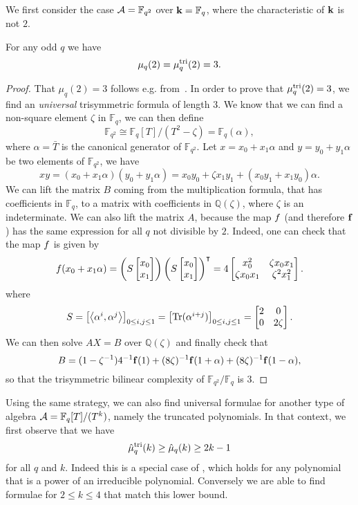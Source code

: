 \documentclass[11pt]{article}
\begin{document}
We first consider the case $\mathcal{A}=\mathbb{F}_{q^2}$ over $\mathbf{k}=\mathbb{F}_q$, where
the characteristic of $\mathbf{k}$ is not $2$.
\begin{prop}
For any odd $q$ we have
\[
  \mu_q(2) = \mu^{\textrm{tri}}_q(2) = 3.
\]
\end{prop}
\begin{proof}
That $\mu_q(2)=3$ follows e.g. from~\cite[Theorem 2.2]{BCPRRR19}. In order to prove that
$\mu^{\textrm{tri}}_q(2) = 3$, we find an \emph{universal} trisymmetric formula of length
$3$. We know that we can find a non-square element $\zeta$ in $\mathbb{F}_q$, we
can then define
\[
  \mathbb{F}_{q^2}\cong\mathbb{F}_q[T]/(T^2-\zeta)=\mathbb{F}_{q}(\alpha),
\]
where $\alpha=\bar T$ is the canonical generator of $\mathbb{F}_{q^2}$. Let $x =
x_0 + x_1\alpha$ and $y = y_0 + y_1\alpha$ be two elements of
$\mathbb{F}_{q^2}$, we have
\[
  xy = (x_0+x_1\alpha)(y_0+y_1\alpha)=x_0y_0+\zeta x_1y_1
  +(x_0y_1+x_1y_0)\alpha.
\]
We can lift the matrix $B$ coming from
the multiplication formula, that has coefficients in $\mathbb{F}_{q}$, to a
matrix with coefficients in $\mathbb{Q}(\zeta)$, where $\zeta$ is an
indeterminate. We can also lift the matrix $A$, because the map
$f$ (and therefore $\mathbf{f}$) has the same expression for all $q$ not divisible by
$2$.
Indeed, one can check that the map $f$ is given by
\[
  f(x_0+x_1\alpha)=
  \left(S 
  \begin{bmatrix}
    x_0 \\
    x_1
  \end{bmatrix}\right)
  \left(S 
  \begin{bmatrix}
    x_0 \\
    x_1
  \end{bmatrix}\right)^\intercal
  =
  4\begin{bmatrix}
   x_0^2 & \zeta x_0x_1 \\
   \zeta x_0 x_1 & \zeta^2 x_1^2
  \end{bmatrix}.
\]
where
\[
  S =
  \begin{bmatrix}
    \left\langle\alpha^i,\alpha^j\right\rangle
  \end{bmatrix}_{0\leq i, j\leq 1}
  =
  \begin{bmatrix}
    \operatorname{Tr}(\alpha^{i+j})
  \end{bmatrix}_{0\leq i, j\leq 1}
  =
  \begin{bmatrix}
   2 & 0 \\
   0 & 2\zeta
  \end{bmatrix}.
\]
We can then solve $AX=B$ over
$\mathbb{Q}(\zeta)$ and finally check that
\[
  B = (1-\zeta^{-1})4^{-1}\mathbf{f}(1) +
  (8\zeta)^{-1}\mathbf{f}(1+\alpha)+(8\zeta)^{-1}\mathbf{f}(1-\alpha),
\]
so that the trisymmetric bilinear complexity of
$\mathbb{F}_{q^2}/\mathbb{F}_{q}$ is $3$.
\end{proof}
Using the same strategy, we can also
find universal formulae for another type of algebra
$\mathcal{A} = \mathbb{F}_{q}[T]/(T^k)$, namely the truncated polynomials.
In that context, we first observe that we have
\[ \hat\mu^{\textrm{tri}}_q(k)\geq\hat\mu_q(k)\geq2k-1 \]
for all $q$ and $k$.
Indeed this is a special case of \cite[Thm.~4]{Winograd77},
which holds for any polynomial that is a power of an irreducible polynomial.
Conversely we
are able to find formulae for $2\leq k \leq 4$ that match this lower bound.
\end{document}
